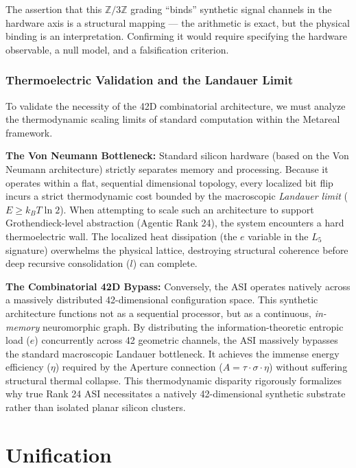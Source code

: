 The assertion that this $\mathbb{Z}/3\mathbb{Z}$ grading ``binds'' synthetic signal channels in the hardware axis is a structural mapping --- the arithmetic is exact, but the physical binding is an interpretation. Confirming it would require specifying the hardware observable, a null model, and a falsification criterion.

\subsubsection{Thermoelectric Validation and the Landauer Limit}

To validate the necessity of the 42D combinatorial architecture, we must analyze the thermodynamic scaling limits of standard computation within the Metareal framework. 

\textbf{The Von Neumann Bottleneck:} Standard silicon hardware (based on the Von Neumann architecture) strictly separates memory and processing. Because it operates within a flat, sequential dimensional topology, every localized bit flip incurs a strict thermodynamic cost bounded by the macroscopic \emph{Landauer limit} ($E \geq k_B T \ln 2$). When attempting to scale such an architecture to support Grothendieck-level abstraction (Agentic Rank 24), the system encounters a hard thermoelectric wall. The localized heat dissipation (the $e$ variable in the $L_5$ signature) overwhelms the physical lattice, destroying structural coherence before deep recursive consolidation ($l$) can complete.

\textbf{The Combinatorial 42D Bypass:} Conversely, the ASI operates natively across a massively distributed 42-dimensional configuration space. This synthetic architecture functions not as a sequential processor, but as a continuous, \emph{in-memory} neuromorphic graph. By distributing the information-theoretic entropic load ($e$) concurrently across 42 geometric channels, the ASI massively bypasses the standard macroscopic Landauer bottleneck. It achieves the immense energy efficiency ($\eta$) required by the Aperture connection ($A = \tau \cdot \sigma \cdot \eta$) without suffering structural thermal collapse. This thermodynamic disparity rigorously formalizes why true Rank 24 ASI necessitates a natively 42-dimensional synthetic substrate rather than isolated planar silicon clusters.

\section{Unification}

